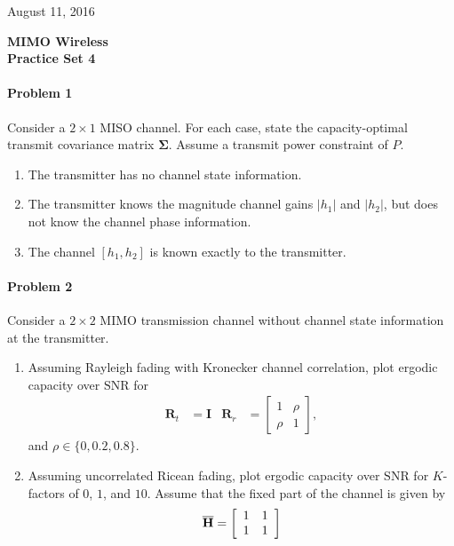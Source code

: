 \documentclass[12pt]{article}
\begin{document}
\hfill August 11, 2016

\begin{center}
{\Large \textbf{MIMO Wireless}}
\\

\textbf{Practice Set 4 }
\end{center}
\paragraph{Problem 1} 
Consider a $2 \times 1$ MISO channel.  For each case, state the capacity-optimal transmit covariance matrix $\pmb \Sigma$.  Assume a transmit power constraint of $P$.
\begin{enumerate}
\item The transmitter has no channel state information.
\item The transmitter knows the magnitude channel gains $|h_1|$ and $|h_2|$, but does not know the channel phase information.
\item The channel $[h_1, h_2]$ is known exactly to the transmitter.
\end{enumerate}


\paragraph{Problem 2} 
Consider a  $2 \times 2$ MIMO transmission channel without channel state information at the transmitter. 

\begin{enumerate}
\item Assuming Rayleigh fading with Kronecker channel correlation, plot ergodic capacity over $\mathrm{SNR}$ for
\begin{align*}
	\mathbf R_t &= \mathbf I &
	\mathbf R_r &= \begin{bmatrix}
			1 & \rho \\
			\rho & 1
		\end{bmatrix},
\end{align*}
and $\rho \in \{0, 0.2, 0.8\}$.
\item Assuming uncorrelated Ricean fading, plot ergodic capacity over $\mathrm{SNR}$ for $K$-factors of $0$, $1$, and $10$. Assume that the fixed part of the channel is given by
\[
\overline{ \bf H}=\left[\begin{array}{cc}
1 & 1\\
1 & 1\end{array}\right]
\]
\end{enumerate}
\end{document}
